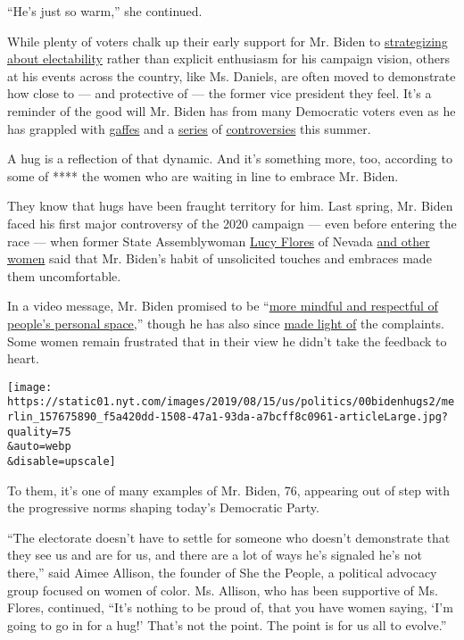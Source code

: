 ``He's just so warm,'' she continued.

While plenty of voters chalk up their early support for Mr. Biden to
\href{https://www.nytimes.com/2019/08/22/us/politics/joe-biden-trump-2020.html}{strategizing
about electability} rather than explicit enthusiasm for his campaign
vision, others at his events across the country, like Ms. Daniels, are
often moved to demonstrate how close to --- and protective of --- the
former vice president they feel. It's a reminder of the good will Mr.
Biden has from many Democratic voters even as he has grappled with
\href{https://www.nytimes.com/2019/08/12/us/politics/joe-biden-gaffes.html}{gaffes}
and a
\href{https://www.nytimes.com/2019/06/06/us/politics/joe-biden-hyde-amendment.html}{series}
of
\href{https://www.nytimes.com/2019/06/19/us/politics/biden-eastland.html}{controversies}
this summer.

A hug is a reflection of that dynamic. And it's something more, too,
according to some of **** the women who are waiting in line to embrace
Mr. Biden.

They know that hugs have been fraught territory for him. Last spring,
Mr. Biden faced his first major controversy of the 2020 campaign ---
even before entering the race --- when former State Assemblywoman
\href{https://www.nytimes.com/2019/03/31/us/politics/joe-biden-flores.html}{Lucy
Flores} of Nevada
\href{https://www.nytimes.com/2019/04/02/us/politics/joe-biden-women-me-too.html}{and
other women} said that Mr. Biden's habit of unsolicited touches and
embraces made them uncomfortable.

In a video message, Mr. Biden promised to be
``\href{https://www.nytimes.com/2019/04/03/us/politics/joe-biden-women-video.html}{more
mindful and respectful of people's personal space,}'' though he has also
since
\href{https://www.nytimes.com/2019/04/05/us/politics/joe-biden-controversy.html}{made
light of} the complaints. Some women remain frustrated that in their
view he didn't take the feedback to heart.

\texttt{[image: https://static01.nyt.com/images/2019/08/15/us/politics/00bidenhugs2/merlin\_157675890\_f5a420dd-1508-47a1-93da-a7bcff8c0961-articleLarge.jpg?quality=75\\\&auto=webp\\\&disable=upscale]}

To them, it's one of many examples of Mr. Biden, 76, appearing out of
step with the progressive norms shaping today's Democratic Party.

``The electorate doesn't have to settle for someone who doesn't
demonstrate that they see us and are for us, and there are a lot of ways
he's signaled he's not there,'' said Aimee Allison, the founder of She
the People, a political advocacy group focused on women of color. Ms.
Allison, who has been supportive of Ms. Flores, continued, ``It's
nothing to be proud of, that you have women saying, `I'm going to go in
for a hug!' That's not the point. The point is for us all to evolve.''


